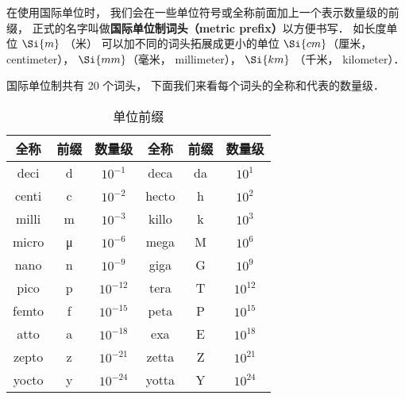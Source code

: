 

在使用国际单位时， 我们会在一些单位符号或全称前面加上一个表示数量级的前缀， 正式的名字叫做\textbf{国际单位制词头（metric prefix）}以方便书写． 如长度单位 $\Si{m}$ （米） 可以加不同的词头拓展成更小的单位 $\Si{cm}$（厘米， centimeter）， $\Si{mm}$（毫米， millimeter）， $\Si{km}$ （千米， kilometer）．

国际单位制共有 20 个词头， 下面我们来看每个词头的全称和代表的数量级．

\begin{table}[ht]
\centering
\caption{单位前缀}\label{UniPre_tab1}
\begin{tabular}{|c|c|c|c|c|c|}
\hline
全称 & 前缀 & 数量级 & 全称 & 前缀 & 数量级 \\
\hline
deci & d & $10^{-1}$ & deca & da & $10^1$ \\
\hline
centi & c & $10^{-2}$ & hecto & h & $10^2$ \\
\hline
milli & m & $10^{-3}$ & killo & k & $10^3$ \\
\hline
micro & μ & $10^{-6}$ & mega & M & $10^6$ \\
\hline
nano & n & $10^{-9}$ & giga & G & $10^9$ \\
\hline
pico & p & $10^{-12}$ & tera & T & $10^{12}$ \\
\hline
femto & f & $10^{-15}$ & peta & P & $10^{15}$ \\
\hline
atto & a & $10^{-18}$ & exa & E & $10^{18}$ \\
\hline
zepto & z & $10^{-21}$ & zetta & Z & $10^{21}$ \\
\hline
yocto & y & $10^{-24}$ & yotta & Y & $10^{24}$ \\
\hline
\end{tabular}
\end{table}
